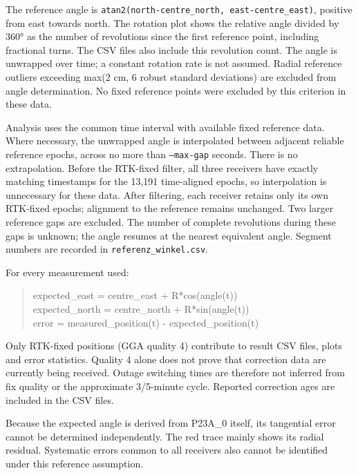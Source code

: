 \documentclass[11pt,a4paper]{article}
\begin{document}
The reference angle is {\small\texttt{atan2(north-centre\_\allowbreak{}north, east-centre\_\allowbreak{}east)}}, positive from east towards north. The rotation plot shows the relative angle divided by 360° as the number of revolutions since the first reference point, including fractional turns. The CSV files also include this revolution count. The angle is unwrapped over time; a constant rotation rate is not assumed. Radial reference outliers exceeding max(2 cm, 6 robust standard deviations) are excluded from angle determination. No fixed reference points were excluded by this criterion in these data.

Analysis uses the common time interval with available fixed reference data. Where necessary, the unwrapped angle is interpolated between adjacent reliable reference epochs, across no more than {\small\texttt{--max-gap}} seconds. There is no extrapolation. Before the RTK-fixed filter, all three receivers have exactly matching timestamps for the 13,191 time-aligned epochs, so interpolation is unnecessary for these data. After filtering, each receiver retains only its own RTK-fixed epochs; alignment to the reference remains unchanged. Two larger reference gaps are excluded. The number of complete revolutions during these gaps is unknown; the angle resumes at the nearest equivalent angle. Segment numbers are recorded in {\small\texttt{referenz\_\allowbreak{}winkel.csv}}.

For every measurement used:

\begin{quote}\ttfamily\footnotesize expected\_east  = centre\_east  + R*cos(angle(t))\\expected\_north = centre\_north + R*sin(angle(t))\\error         = measured\_position(t) - expected\_position(t)\end{quote}

Only RTK-fixed positions (GGA quality 4) contribute to result CSV files, plots and error statistics. Quality 4 alone does not prove that correction data are currently being received. Outage switching times are therefore not inferred from fix quality or the approximate 3/5-minute cycle. Reported correction ages are included in the CSV files.

Because the expected angle is derived from P23A\_0 itself, its tangential error cannot be determined independently. The red trace mainly shows its radial residual. Systematic errors common to all receivers also cannot be identified under this reference assumption.
\end{document}
